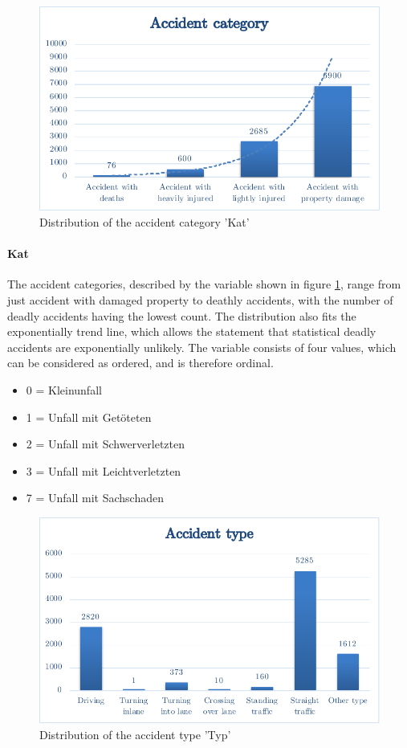 \documentclass[a4paper,12pt]{report}
\begin{document}
\begin{figure}[h]
	\centering
	\includegraphics[scale=0.6]{./assets/baysis_dataset_Kat.pdf}
	\caption{Distribution of the accident category 'Kat'}
	\label{img:baysis_dataset_Kat}
\end{figure}

\paragraph{Kat}
The accident categories, described by the variable shown in figure \ref{img:baysis_dataset_Kat},  range from just accident with damaged property to deathly accidents, with the number of deadly accidents having the lowest count. The distribution also fits the exponentially trend line, which allows the statement that statistical deadly accidents are exponentially unlikely. The variable consists of four values, which can be considered as ordered, and is therefore ordinal.

\begin{itemize}
	\setlength\itemsep{0.05em}
	\item 0 = Kleinunfall
	\item 1 = Unfall mit Getöteten
	\item 2 = Unfall mit Schwerverletzten
	\item 3 = Unfall mit Leichtverletzten
	\item 7 = Unfall mit Sachschaden
\end{itemize}

\begin{figure}[h]
	\centering
	\includegraphics[scale=0.6]{./assets/baysis_dataset_Typ.pdf}
	\caption{Distribution of the accident type 'Typ'}
	\label{img:baysis_dataset_Typ}
\end{figure}
\end{document}
